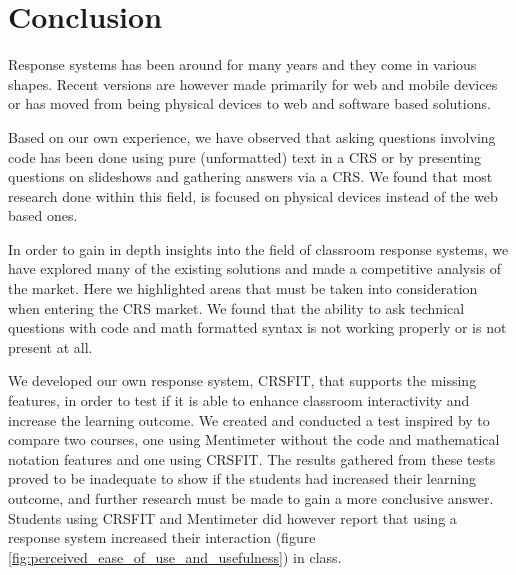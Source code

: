 \section{Conclusion}



Response systems has been around for many years and they come in various shapes. Recent versions are however made primarily for web and mobile devices or has moved from being physical devices to web and software based solutions.

Based on our own experience, we have observed that asking questions involving code has been done using pure (unformatted) text in a CRS or by presenting questions on slideshows and gathering answers via a CRS. We found that most research done within this field, is focused on physical devices instead of the web based ones.

In order to gain in depth insights into the field of classroom response systems, we have explored many of the existing solutions and made a competitive analysis of the market. Here we highlighted areas that must be taken into consideration when entering the CRS market. We found that the ability to ask technical questions with code and math formatted syntax is not working properly or is not present at all. 

We developed our own response system, CRSFIT, that supports the missing features, in order to test if it is able to enhance classroom interactivity and increase the learning outcome. We created and conducted a test inspired by  to compare two courses, one using Mentimeter without the code and mathematical notation features and one using CRSFIT. 
The results gathered from these tests proved to be inadequate to show if the students had increased their learning outcome, and further research must be made to gain a more conclusive answer. Students using CRSFIT and Mentimeter did however report that using a response system increased their interaction (figure \ref{fig:perceived_ease_of_use_and_usefulness}) in class.






